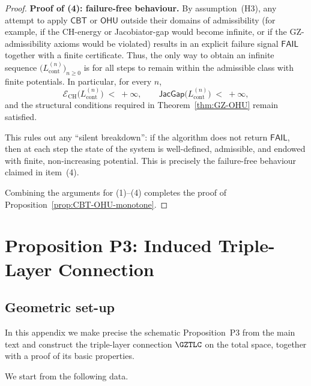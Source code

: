 \documentclass[11pt]{book}
\theoremstyle{plain}
\theoremstyle{definition}
\begin{document}
\begin{proof}
\medskip\noindent
\textbf{Proof of (4): failure-free behaviour.}
By assumption~(H3), any attempt to apply \(\mathsf{CBT}\) or
\(\mathsf{OHU}\) outside their domains of admissibility (for example,
if the CH-energy or Jacobiator-gap would become infinite, or if the
GZ-admissibility axioms would be violated) results in an explicit
failure signal \(\mathsf{FAIL}\) together with a finite certificate.
Thus, the only way to obtain an infinite sequence
\(\bigl(L_{\mathrm{cont}}^{(n)}\bigr)_{n\ge 0}\) is for all steps to
remain within the admissible class with finite potentials.  In
particular, for every \(n\),
\[
  \mathcal{E}_{\mathrm{CH}}\bigl(
    L_{\mathrm{cont}}^{(n)}
  \bigr)
  \;<\;+\infty,
  \qquad
  \mathsf{JacGap}\bigl(
    L_{\mathrm{cont}}^{(n)}
  \bigr)
  \;<\;+\infty,
\]
and the structural conditions required in
Theorem~\ref{thm:GZ-OHU} remain satisfied.

This rules out any ``silent breakdown'': if the algorithm does not
return \(\mathsf{FAIL}\), then at each step the state of the system is
well-defined, admissible, and endowed with finite, non-increasing
potential.  This is precisely the failure-free behaviour claimed in
item~(4).



\medskip
Combining the arguments for \textnormal{(1)}–\textnormal{(4)} completes
the proof of Proposition~\ref{prop:CBT-OHU-monotone}.
\end{proof}



\section{Proposition P3: Induced Triple-Layer Connection}
\label{app:I-P3}

\subsection*{Geometric set-up}


In this appendix we make precise the schematic Proposition~P3 from the
main text and construct the triple-layer connection \(\GZTLC\) on the
total space, together with a proof of its basic properties.

We start from the following data.
\end{document}
